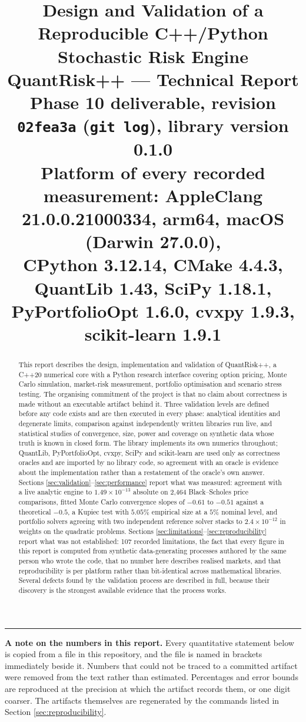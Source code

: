 \documentclass[11pt,a4paper]{article}
\title{\textbf{Design and Validation of a Reproducible C++/Python\\
Stochastic Risk Engine}\\[1.2ex]
\large QuantRisk++ --- Technical Report\\[0.6ex]
\normalsize Phase 10 deliverable, revision \texttt{02fea3a} (\texttt{git log}), library
version 0.1.0\\
\vspace{0.4ex}
\normalsize Platform of every recorded measurement: AppleClang 21.0.0.21000334, arm64,
macOS (Darwin 27.0.0),\\
CPython 3.12.14, CMake 4.4.3, QuantLib 1.43, SciPy 1.18.1, PyPortfolioOpt 1.6.0,
cvxpy 1.9.3, scikit-learn 1.9.1}
\author{}
\date{}
\begin{document}
\maketitle
\thispagestyle{empty}

\begin{abstract}
\noindent
This report describes the design, implementation and validation of QuantRisk++, a
C++20 numerical core with a Python research interface covering option pricing, Monte
Carlo simulation, market-risk measurement, portfolio optimisation and scenario stress
testing. The organising commitment of the project is that no claim about correctness is
made without an executable artifact behind it. Three validation levels are defined before
any code exists and are then executed in every phase: analytical identities and
degenerate limits, comparison against independently written libraries run live, and
statistical studies of convergence, size, power and coverage on synthetic data whose truth
is known in closed form. The library implements its own numerics throughout; QuantLib,
PyPortfolioOpt, cvxpy, SciPy and scikit-learn are used only as correctness oracles and are
imported by no library code, so agreement with an oracle is evidence about the
implementation rather than a restatement of the oracle's own answer.
Sections \ref{sec:validation}--\ref{sec:performance} report what was measured: agreement
with a live analytic engine to $1.49\times 10^{-13}$ absolute on 2{,}464 Black--Scholes
price comparisons, fitted Monte Carlo convergence slopes of $-0.61$ to $-0.51$ against a
theoretical $-0.5$, a Kupiec test with $5.05\%$ empirical size at a $5\%$ nominal level,
and portfolio solvers agreeing with two independent reference solver stacks to
$2.4\times 10^{-12}$ in weights on the quadratic problems. Sections
\ref{sec:limitations}--\ref{sec:reproducibility} report what was not established: 107
recorded limitations, the fact that every figure in this report is computed from synthetic
data-generating processes authored by the same person who wrote the code, that no number
here describes realised markets, and that reproducibility is per platform rather than
bit-identical across mathematical libraries. Several defects found by the validation
process are described in full, because their discovery is the strongest available evidence
that the process works.
\end{abstract}

\vspace{1em}
\hrule
\vspace{0.6em}
\noindent\textbf{A note on the numbers in this report.} Every quantitative statement below
is copied from a file in this repository, and the file is named in
{\footnotesize\ttfamily brackets} immediately beside it. Numbers that could not be traced to
a committed artifact were removed from the text rather than estimated. Percentages and
error bounds are reproduced at the precision at which the artifact records them, or one
digit coarser. The artifacts themselves are regenerated by the commands listed in
Section \ref{sec:reproducibility}.
\end{document}
